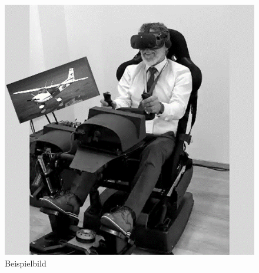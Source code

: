 \begin{figure}[!ht]
    \centering
    \includegraphics[width=1.0\textwidth]{images/Abbildung 1}
    \caption{\label{fig:Abbildung 1}Beispielbild\protect
    }
\end{figure}
